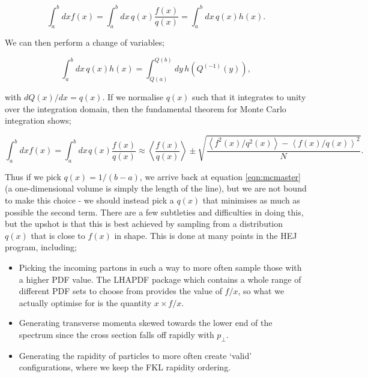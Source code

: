 \begin{equation}
\int_a^b dx f(x) = \int_a^b dx \hspace{2pt} q(x) \frac{f(x)}{q(x)} = \int_a^b dx \hspace{2pt} q(x) h(x).
\end{equation}

We can then perform a change of variables;

\begin{equation}
\int_a^b dx \hspace{2pt} q(x) h(x) = \int_{Q(a)}^{Q(b)} dy \hspace{2pt} h \left(Q^{(-1)}(y) \right),
\end{equation}

with $dQ(x)/dx = q(x)$. If we normalise $q(x)$ such that it integrates to unity over the integration domain, then the fundamental theorem for Monte Carlo integration shows;

\begin{equation}
\int_a^b dx f(x) = \int_a^b dx \hspace{1pt} q(x) \frac{f(x)}{q(x)} \approx \left< \frac{f(x)}{q(x)} \right> \pm \sqrt{\frac{\left<f^2(x)/q^2(x)\right> - \left<f(x)/q(x) \right>^2}{N}}.
\end{equation} 

Thus if we pick $q(x) = 1/(b-a)$, we arrive back at equation \ref{eqn:mcmaster} (a one-dimensional volume is simply the length of the line), but we are not bound to make this choice - we should instead pick a $q(x)$ that minimises as much as possible the second term. There are a few subtleties and difficulties in doing this, but the upshot is that this is best achieved by sampling from a distribution $q(x)$ that is close to $f(x)$ in shape. This is done at many points in the HEJ program, including;
\begin{itemize} 
\item{Picking the incoming partons in such a way to more often sample those with a higher PDF value. The LHAPDF package \cite{Buckley2014} which contains a whole range of different PDF sets to choose from provides the value of $f/x$, so what we actually optimise for is the quantity $x \times f/x$.}
\item{Generating transverse momenta skewed towards the lower end of the spectrum since the cross section falls off rapidly with $p_\perp$.}
\item{Generating the rapidity of particles to more often create `valid' configurations, where we keep the FKL rapidity ordering.}
\end{itemize}


